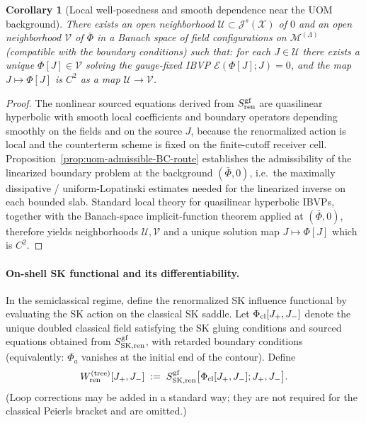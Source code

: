 \documentclass[10pt]{article}
\theoremstyle{definition}
\theoremstyle{plain}
\newtheorem{corollary}{Corollary}[section]
\begin{document}
\begin{corollary}[Local well-posedness and smooth dependence near the UOM background]
\label{cor:uom-wp-smooth}
There exists an open neighborhood $\mathcal U\subset \mathcal J^s(\mathscr X)$ of $0$ and an open neighborhood $\mathcal V$ of $\bar\Phi$
in a Banach space of field configurations on $\mathcal M^{(\Lambda)}$ (compatible with the boundary conditions) such that:
for each $J\in\mathcal U$ there exists a unique $\Phi[J]\in\mathcal V$ solving the gauge-fixed IBVP
$\mathcal E(\Phi[J];J)=0$, and the map $J\mapsto \Phi[J]$ is $C^2$ as a map $\mathcal U\to\mathcal V$.
\end{corollary}

\begin{proof}
The nonlinear sourced equations derived from $S_{\rm ren}^{\rm gf}$ are quasilinear hyperbolic with smooth local coefficients and
boundary operators depending smoothly on the fields and on the source $J$, because the renormalized action is local and the counterterm
scheme is fixed on the finite-cutoff receiver cell.  Proposition~\ref{prop:uom-admissible-BC-route} establishes the admissibility of the
linearized boundary problem at the background $(\bar\Phi,0)$, i.e.\ the maximally dissipative / uniform-Lopatinski estimates needed for
the linearized inverse on each bounded slab.  Standard local theory for quasilinear hyperbolic IBVPs, together with the Banach-space
implicit-function theorem applied at $(\bar\Phi,0)$, therefore yields neighborhoods $\mathcal U,\mathcal V$ and a unique solution map
$J\mapsto\Phi[J]$ which is $C^2$.
\end{proof}

\paragraph{On-shell SK functional and its differentiability.}
In the semiclassical regime, define the renormalized SK influence functional by evaluating the SK action on the classical SK saddle.
Let $\Phi_{\rm cl}[J_+,J_-]$ denote the unique doubled classical field satisfying the SK gluing conditions and sourced equations obtained
from $S_{\rm SK,ren}^{\rm gf}$, with retarded boundary conditions (equivalently: $\Phi_a$ vanishes at the initial end of the contour).
Define
\begin{equation}
W_{\rm ren}^{\rm (tree)}[J_+,J_-]\;:=\;S_{\rm SK,ren}^{\rm gf}\big[\Phi_{\rm cl}[J_+,J_-];J_+,J_-\big].
\label{eq:W-tree}
\end{equation}
(Loop corrections may be added in a standard way; they are not required for the classical Peierls bracket and are omitted.)
\end{document}
